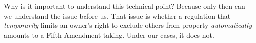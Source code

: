 Why is it important to understand this technical point? Because only then can we
understand the issue before us. That issue is whether a regulation that
\textit{temporarily} limits an owner's right to exclude others from property
\textit{automatically} amounts to a Fifth Amendment taking. Under our cases, it
does not.



%
%
%
%
%
%
%
